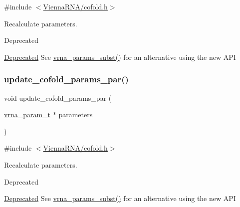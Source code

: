 {\ttfamily \#include $<$\hyperlink{cofold_8h}{Vienna\+R\+N\+A/cofold.\+h}$>$}



Recalculate parameters. 

\begin{DoxyRefDesc}{Deprecated}
\item[\hyperlink{deprecated__deprecated000033}{Deprecated}]See \hyperlink{group__energy__parameters_ga5d1909208f7ea3baa98b75afaa1f62ca}{vrna\+\_\+params\+\_\+subst()} for an alternative using the new A\+PI \end{DoxyRefDesc}
\mbox{\label{group__mfe__cofold_gaaadbd28b4e428710529ab4098fdacad3}} 
\subsubsection{\texorpdfstring{update\+\_\+cofold\+\_\+params\+\_\+par()}{update\_cofold\_params\_par()}}
{\footnotesize\ttfamily void update\+\_\+cofold\+\_\+params\+\_\+par (\begin{DoxyParamCaption}\item[{\hyperlink{group__energy__parameters_ga8a69ca7d787e4fd6079914f5343a1f35}{vrna\+\_\+param\+\_\+t} $\ast$}]{parameters }\end{DoxyParamCaption})}



{\ttfamily \#include $<$\hyperlink{cofold_8h}{Vienna\+R\+N\+A/cofold.\+h}$>$}



Recalculate parameters. 

\begin{DoxyRefDesc}{Deprecated}
\item[\hyperlink{deprecated__deprecated000034}{Deprecated}]See \hyperlink{group__energy__parameters_ga5d1909208f7ea3baa98b75afaa1f62ca}{vrna\+\_\+params\+\_\+subst()} for an alternative using the new A\+PI \end{DoxyRefDesc}
\mbox{\label{group__mfe__cofold_ga5f5bf4df35d0554f6ace9579f8744c48}} 
